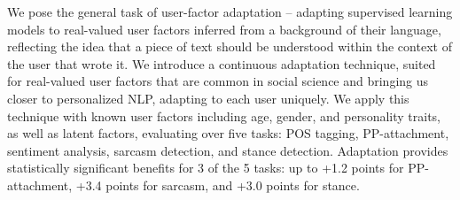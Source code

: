 We pose the general task of user-factor adaptation -- adapting supervised learning models to real-valued user factors inferred from a background of their language, reflecting the idea that a piece of text should be understood within the context of the user that wrote it. We introduce a continuous adaptation technique, suited for real-valued user factors that are common in social science and bringing us closer to personalized NLP, adapting to each user uniquely. We apply this technique with known user factors including age, gender, and personality traits, as well as latent factors, evaluating over five tasks: POS tagging, PP-attachment, sentiment analysis, sarcasm detection, and stance detection. Adaptation provides statistically significant benefits for 3 of the 5 tasks: up to +1.2 points for PP-attachment, +3.4 points for sarcasm, and +3.0 points for stance.
